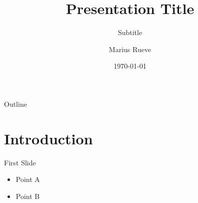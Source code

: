 \documentclass{beamer}
\title{Presentation Title}
\subtitle{Subtitle}
\author{Marius Rueve}
\institute{University of Hamburg}
\date{\today}
\begin{document}
\begin{frame}
    \titlepage
\end{frame}

\begin{frame}{Outline}
    \tableofcontents
\end{frame}

\section{Introduction}
\begin{frame}{First Slide}
    \begin{itemize}
        \item Point A
        \item Point B
    \end{itemize}
\end{frame}
\end{document}
